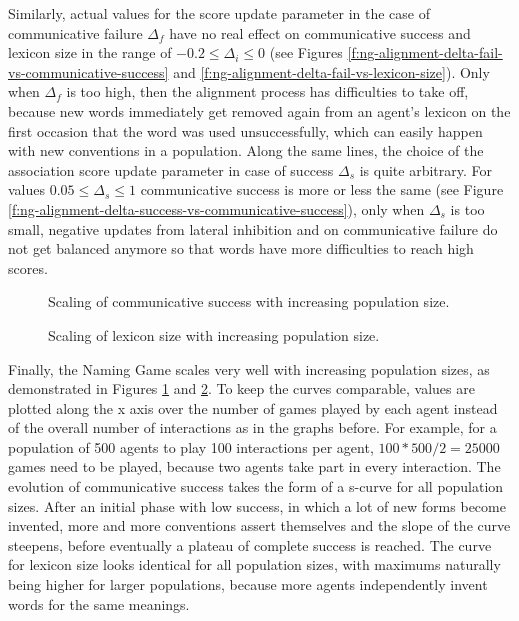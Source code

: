 Similarly, actual values for the score update parameter in the case of
communicative failure $\Delta_f$ have no real effect on communicative
success and lexicon size in the range of $-0.2\leq \Delta_i \leq 0$
(see Figures \ref{f:ng-alignment-delta-fail-vs-communicative-success}
and \ref{f:ng-alignment-delta-fail-vs-lexicon-size}). Only when
$\Delta_f$ is too high, then the alignment process has difficulties to
take off, because new words immediately get removed again from an
agent's lexicon on the first occasion that the word was used
unsuccessfully, which can easily happen with new conventions in a
population. Along the same lines, the choice of the association score
update parameter in case of success $\Delta_s$ is quite arbitrary. For
values $0.05 \leq \Delta_s \leq 1$ communicative success is more or
less the same (see Figure
\ref{f:ng-alignment-delta-success-vs-communicative-success}), only
when $\Delta_s$ is too small, negative updates from lateral inhibition
and on communicative failure do not get balanced anymore so that words
have more difficulties to reach high scores.\\

\startfiguregroup

\begin{figure}[t]
  \label{f:ng-population-size-vs-communicative-success}
  \caption{Scaling of communicative success with increasing population
    size.}
\end{figure}

\begin{figure}[t]
  \label{f:ng-population-size-vs-lexicon-size}
  \caption{Scaling of lexicon size with increasing population size.}
\end{figure}

\stopfiguregroup

\noindent Finally, the Naming Game scales very well with increasing
population sizes, as demonstrated in Figures
\ref{f:ng-population-size-vs-communicative-success} and
\ref{f:ng-population-size-vs-lexicon-size}. To keep the curves
comparable, values are plotted along the x axis over the number of
games played by each agent instead of the overall number of
interactions as in the graphs before. For example, for a population of
500 agents to play 100 interactions per agent, $100 * 500 / 2 = 25000$
games need to be played, because two agents take part in every
interaction. The evolution of communicative success takes the form of
a s-curve for all population sizes. After an initial phase with low
success, in which a lot of new forms become invented, more and more
conventions assert themselves and the slope of the curve steepens,
before eventually a plateau of complete success is reached. The curve
for lexicon size looks identical for all population sizes, with
maximums naturally being higher for larger populations, because more
agents independently invent words for the same meanings.

